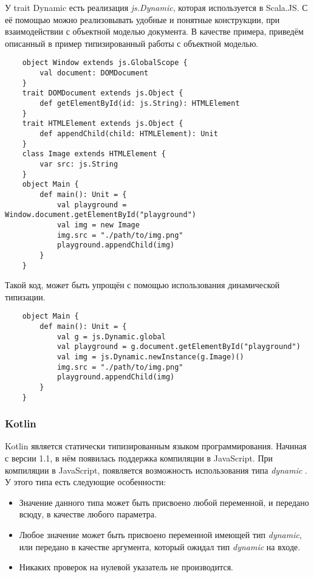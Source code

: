 У trait Dynamic есть реализация \textit{js.Dynamic}, которая используется в Scala.JS. С её помощью можно реализовывать удобные и понятные конструкции, при взаимодействии с объектной моделью документа. В качестве примера, приведём описанный в \cite{art:doeraene2013scala} пример типизированный работы с объектной моделью.

\begin{verbatim}
    object Window extends js.GlobalScope {
        val document: DOMDocument
    }
    trait DOMDocument extends js.Object {
        def getElementById(id: js.String): HTMLElement
    }
    trait HTMLElement extends js.Object {
        def appendChild(child: HTMLElement): Unit
    }
    class Image extends HTMLElement {
        var src: js.String
    }
    object Main {
        def main(): Unit = {
            val playground = Window.document.getElementById("playground")
            val img = new Image
            img.src = "./path/to/img.png"
            playground.appendChild(img)
        }
    }
\end{verbatim}

Такой код, может быть упрощён с помощью использования динамической типизации.

\begin{verbatim}
    object Main {
        def main(): Unit = {
            val g = js.Dynamic.global
            val playground = g.document.getElementById("playground")
            val img = js.Dynamic.newInstance(g.Image)()
            img.src = "./path/to/img.png"
            playground.appendChild(img)
        }
    }
\end{verbatim}

\subsubsection{Kotlin}
Kotlin является статически типизированным языком программирования. Начиная с версии 1.1, в нём появилась 
поддержка компиляции в JavaScript. При компиляции в JavaScript, появляется возможность использования типа \textit{dynamic} \cite{kotlin:dynamicType}. У этого типа есть следующие особенности:

\begin{itemize}
    \item Значение данного типа может быть присвоено любой переменной, и передано всюду, в качестве любого параметра.
    \item Любое значение может быть присвоено переменной имеющей тип \textit{dynamic}, или передано в качестве аргумента, который ожидал тип \textit{dynamic} на входе.
    \item Никаких проверок на нулевой указатель не производится.
\end{itemize}

